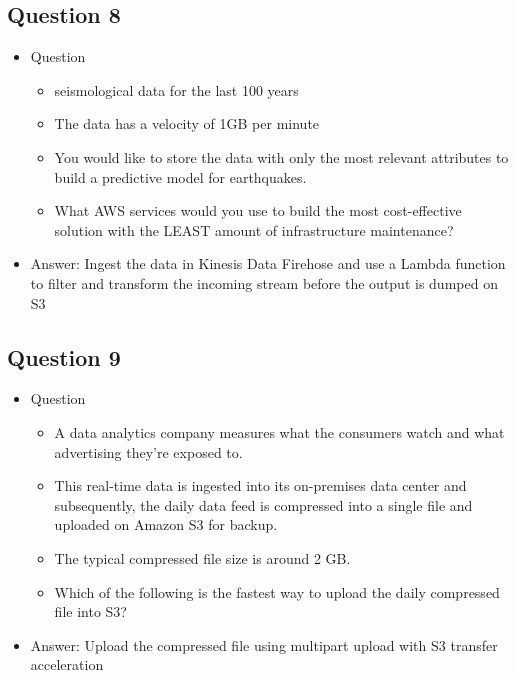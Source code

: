 \documentclass[]{scrartcl}
\begin{document}
\subsection{Question 8}
\begin{itemize}
	\item Question
	\begin{itemize}
		\item seismological data for the last 100 years
		\item The data has a velocity of 1GB per minute
		\item You would like to store the data with only the most relevant attributes to build a predictive model for earthquakes.
		\item What AWS services would you use to build the most cost-effective solution with the LEAST amount of infrastructure maintenance?
	\end{itemize}
	\item Answer: Ingest the data in Kinesis Data Firehose and use a Lambda function to filter and transform the incoming stream before the output is dumped on S3
\end{itemize}

\subsection{Question 9}
\begin{itemize}
	\item Question
	\begin{itemize}
		\item A data analytics company measures what the consumers watch and what advertising they’re exposed to. \item This real-time data is ingested into its on-premises data center and subsequently, the daily data feed is compressed into a single file and uploaded on Amazon S3 for backup. 
		\item The typical compressed file size is around 2 GB.
		\item Which of the following is the fastest way to upload the daily compressed file into S3?
	\end{itemize}
	\item Answer: Upload the compressed file using multipart upload with S3 transfer acceleration
\end{itemize}
\end{document}
